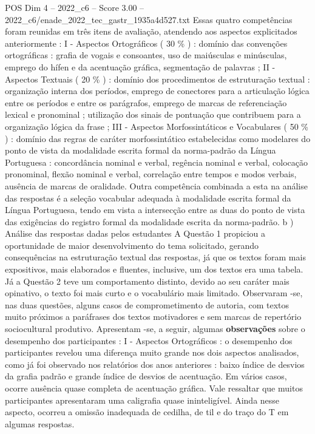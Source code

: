 \begin{textsample}{POS Dim 4 – 2022\_c6 – Score 3.00 – 2022\_c6/enade\_2022\_tec\_gastr\_1935a4d527.txt}
Essas quatro competências foram reunidas em três itens de avaliação, atendendo aos aspectos explicitados anteriormente : I - Aspectos Ortográficos ( 30 \% ) : domínio das convenções ortográficas : grafia de vogais e consoantes, uso de maiúsculas e minúsculas, emprego do hífen e da acentuação gráfica, segmentação de palavras ; II - Aspectos Textuais ( 20 \% ) : domínio dos procedimentos de estruturação textual : organização interna dos períodos, emprego de conectores para a articulação lógica entre os períodos e entre os parágrafos, emprego de marcas de referenciação lexical e pronominal ; utilização dos sinais de pontuação que contribuem para a organização lógica da frase ; III - Aspectos Morfossintáticos e Vocabulares ( 50 \% ) : domínio das regras de caráter morfossintático estabelecidas como modelares do ponto de vista da modalidade escrita formal da norma-padrão da Língua Portuguesa : concordância nominal e verbal, regência nominal e verbal, colocação pronominal, flexão nominal e verbal, correlação entre tempos e modos verbais, ausência de marcas de oralidade.
Outra competência combinada a esta na análise das respostas é a seleção vocabular adequada à modalidade escrita formal da Língua Portuguesa, tendo em vista a intersecção entre as duas do ponto de vista das exigências do registro formal da modalidade escrita da norma-padrão. b ) Análise das respostas dadas pelos estudantes A Questão 1 propiciou a oportunidade de maior desenvolvimento do tema solicitado, gerando consequências na estruturação textual das respostas, já que os textos foram mais expositivos, mais elaborados e fluentes, inclusive, um dos textos era uma tabela.
Já a Questão 2 teve um comportamento distinto, devido ao seu caráter mais opinativo, o texto foi mais curto e o vocabulário mais limitado.
Observaram -se, nas duas questões, alguns casos de comprometimento de autoria, com textos muito próximos a paráfrases dos textos motivadores e sem marcas de repertório sociocultural produtivo.
Apresentam -se, a seguir, algumas \textbf{observações} sobre o desempenho dos participantes : I - Aspectos Ortográficos : o desempenho dos participantes revelou uma diferença muito grande nos dois aspectos analisados, como já foi observado nos relatórios dos anos anteriores : baixo índice de desvios da grafia padrão e grande índice de desvios de acentuação.
Em vários casos, ocorre ausência quase completa de acentuação gráfica.
Vale ressaltar que muitos participantes apresentaram uma caligrafia quase ininteligível.
Ainda nesse aspecto, ocorreu a omissão inadequada de cedilha, de til e do traço do T em algumas respostas.

\end{textsample}
